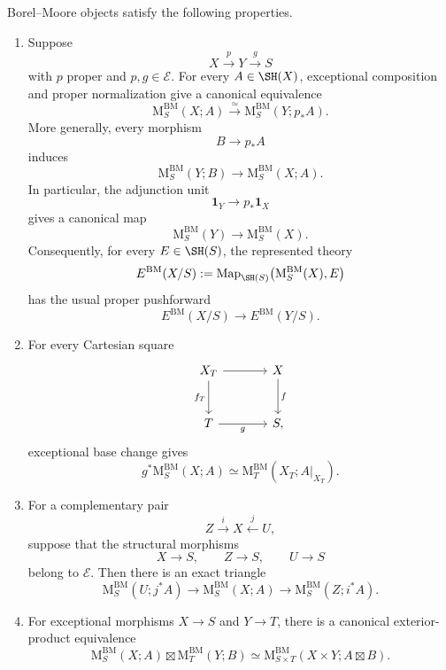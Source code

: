 \begin{proposition}
\label{prop:borel-moore-formal-properties}
Borel--Moore objects satisfy the following properties.
\begin{enumerate}
    \item Suppose
    \[
        X\xrightarrow{p}Y\xrightarrow{g}S
    \]
    with \(p\) proper and \(p,g\in\mathcal E\).  For every
    \(A\in\SH(X)\), exceptional composition and proper normalization give
    a canonical equivalence
    \[
        \mathrm M^{\mathrm{BM}}_S(X;A)
        \xrightarrow{\simeq}
        \mathrm M^{\mathrm{BM}}_S(Y;p_*A).
    \]
    More generally, every morphism
    \[
        B\longrightarrow p_*A
    \]
    induces
    \[
        \mathrm M^{\mathrm{BM}}_S(Y;B)
        \longrightarrow
        \mathrm M^{\mathrm{BM}}_S(X;A).
    \]
    In particular, the adjunction unit
    \[
        \mathbf1_Y
        \longrightarrow
        p_*\mathbf1_X
    \]
    gives a canonical map
    \[
        \mathrm M^{\mathrm{BM}}_S(Y)
        \longrightarrow
        \mathrm M^{\mathrm{BM}}_S(X).
    \]
    Consequently, for every \(E\in\SH(S)\), the represented theory
    \[
        E^{\mathrm{BM}}(X/S)
        :=
        \operatorname{Map}_{\SH(S)}
        \bigl(
          \mathrm M^{\mathrm{BM}}_S(X),
          E
        \bigr)
    \]
    has the usual proper pushforward
    \[
        E^{\mathrm{BM}}(X/S)
        \longrightarrow
        E^{\mathrm{BM}}(Y/S).
    \]

    \item For every Cartesian square
    \[
    \begin{tikzcd}[column sep=large,row sep=large]
        X_T \arrow[r] \arrow[d,"f_T"']
            & X \arrow[d,"f"] \\
        T \arrow[r,"g"']
            & S,
    \end{tikzcd}
    \]
    exceptional base change gives
    \[
        g^*\mathrm M^{\mathrm{BM}}_S(X;A)
        \simeq
        \mathrm M^{\mathrm{BM}}_T(X_T;A|_{X_T}).
    \]

    \item For a complementary pair
    \[
        Z\xrightarrow{i}X\xleftarrow{j}U,
    \]
    suppose that the structural morphisms
    \[
        X\longrightarrow S,
        \qquad
        Z\longrightarrow S,
        \qquad
        U\longrightarrow S
    \]
    belong to \(\mathcal E\).  Then there is an exact triangle
    \[
        \mathrm M^{\mathrm{BM}}_S(U;j^*A)
        \longrightarrow
        \mathrm M^{\mathrm{BM}}_S(X;A)
        \longrightarrow
        \mathrm M^{\mathrm{BM}}_S(Z;i^*A).
    \]

    \item For exceptional morphisms \(X\to S\) and \(Y\to T\), there is a
    canonical exterior-product equivalence
    \[
        \mathrm M^{\mathrm{BM}}_S(X;A)
        \boxtimes
        \mathrm M^{\mathrm{BM}}_T(Y;B)
        \simeq
        \mathrm M^{\mathrm{BM}}_{S\times T}
        (X\times Y;A\boxtimes B).
    \]
\end{enumerate}
\end{proposition}

